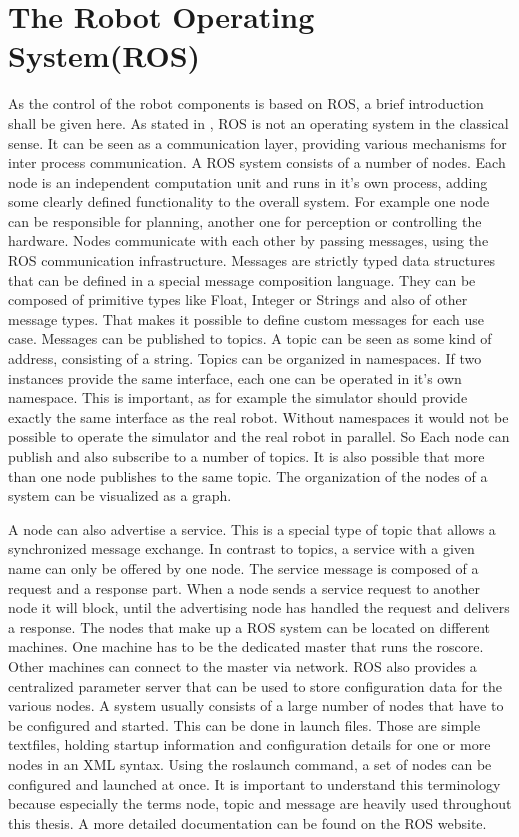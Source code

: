 \section{The Robot Operating System(ROS)}
As the control of the robot components is based on ROS, a brief introduction shall be given here. As stated in \cite{quigley2009}, ROS is not an operating system in the classical sense. It can be seen as a communication layer, providing various mechanisms for inter process communication. A ROS system consists of a number of nodes. Each node is an independent computation unit and runs in it's own process, adding some clearly defined functionality to the overall system. For example one node can be responsible for planning, another one for perception or controlling the hardware. Nodes communicate with each other by passing messages, using the ROS communication infrastructure. Messages are strictly typed data structures that can be defined in a special message composition language. They can be composed of primitive types like Float, Integer or Strings and also of other message types. That makes it possible to define custom messages for each use case. Messages can be published to topics. A topic can be seen as some kind of address, consisting of a string. Topics can be organized in namespaces. If two instances provide the same interface, each one can be operated in it's own namespace. This is important, as for example the simulator should provide exactly the same interface as the real robot. Without namespaces it would not be possible to operate the simulator and the real robot in parallel. So Each node can publish and also subscribe to a number of topics. It is also possible that more than one node publishes to the same topic. The organization of the nodes of a system can be visualized as a graph.

A node can also advertise a service. This is a special type of topic that allows a synchronized message exchange. In contrast to topics, a service with a given name can only be offered by one node. The service message is composed of a request and a response part. When a node sends a service request to another node it will block, until the advertising node has handled the request and delivers a response. The nodes that make up a ROS system can be located on different machines. One machine has to be the dedicated master that runs the roscore. Other machines can connect to the master via network. ROS also provides a centralized parameter server that can be used to store configuration data for the various nodes. A system usually consists of a large number of nodes that have to be configured and started. This can be done in launch files. Those are simple textfiles, holding startup information and configuration details for one or more nodes in an XML syntax. Using the roslaunch command, a set of nodes can be configured and launched at once. It is important to understand this terminology because especially the terms node, topic and message are heavily used throughout this thesis. A more detailed documentation can be found on the ROS website.

